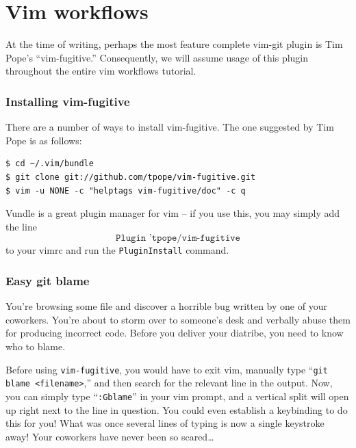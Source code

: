 \documentclass[12pt]{report}
\renewcommand\section[1]{{\chapter{#1}}}
\begin{document}
\section{Vim workflows}

At the time of writing, perhaps the most feature complete vim-git
plugin is Tim Pope’s “vim-fugitive.” Consequently, we will assume
usage of this plugin throughout the entire vim workflows tutorial.

\subsection{Installing vim-fugitive}

There are a number of ways to install vim-fugitive. The one suggested
by Tim Pope is as follows:
\begin{verbatim}
$ cd ~/.vim/bundle
$ git clone git://github.com/tpope/vim-fugitive.git
$ vim -u NONE -c "helptags vim-fugitive/doc" -c q
\end{verbatim}
Vundle is a great plugin manager for vim -- if you use this, you may
simply add the line
\[
  \texttt{Plugin 'tpope/vim-fugitive}
\]
to your vimrc and run the \texttt{PluginInstall} command.

\subsection{Easy git blame}
You’re browsing some file and discover a horrible bug written by one
of your coworkers. You’re about to storm over to someone’s desk and
verbally abuse them for producing incorrect code. Before you deliver
your diatribe, you need to know who to blame.

Before using \texttt{vim-fugitive}, you would have to exit vim,
manually type “\texttt{git blame <filename>},” and then search for the
relevant line in the output. Now, you can simply type
“\texttt{:Gblame}” in your vim prompt, and a vertical split will open
up right next to the line in question. You could even establish a
keybinding to do this for you! What was once several lines of typing
is now a single keystroke away! Your coworkers have never been so
scared\ldots




\end{document}
